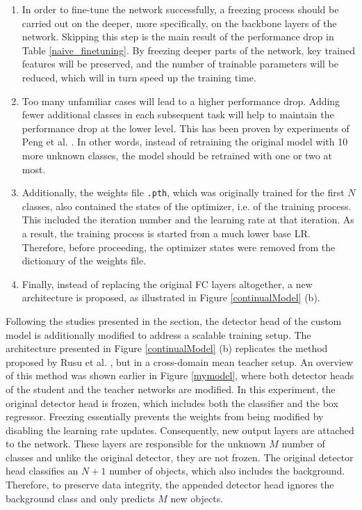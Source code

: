 \begin{enumerate}
\item In order to fine-tune the network successfully, a freezing process should be carried out on the deeper, more specifically, on the backbone layers of the network. Skipping this step is the main result of the performance drop in Table \ref{naive_finetuning}. By freezing deeper parts of the network, key trained features will be preserved, and the number of trainable parameters will be reduced, which will in turn speed up the training time. 
\item Too many unfamiliar cases will lead to a higher performance drop. Adding fewer additional classes in each subsequent task will help to maintain the performance drop at the lower level. This has been proven by experiments of Peng et al. \cite{Peng2020}. In other words, instead of retraining the original model with 10 more unknown classes, the model should be retrained with one or two at most. 
\item Additionally, the weights file \texttt{.pth}, which was originally trained for the first $N$ classes, also contained the states of the optimizer, i.e. of the training process. This included the iteration number and the learning rate at that iteration. As a result, the training process is started from a much lower base LR. Therefore, before proceeding, the optimizer states were removed from the dictionary of the weights file. 
\item Finally, instead of replacing the original FC layers altogether, a new architecture is proposed, as illustrated in Figure \ref{continualModel} (b). 
\end{enumerate}

Following the studies presented in the  section, the detector head of the custom model is additionally modified to address a scalable training setup. The architecture presented in Figure \ref{continualModel} (b) replicates the method proposed by Rusu et al. \cite{Rusu2016}, but in a cross-domain mean teacher setup. An overview of this method was shown earlier in Figure \ref{mymodel}, where both detector heads of the student and the teacher networks are modified. In this experiment, the original detector head is frozen, which includes both the classifier and the box regressor. Freezing essentially prevents the weights from being modified by disabling the learning rate updates. Consequently, new output layers are attached to the network. These layers are responsible for the unknown $M$ number of classes and unlike the original detector, they are not frozen. The original detector head classifies an $N+1$ number of objects, which also includes the background. Therefore, to preserve data integrity, the appended detector head ignores the background class and only predicts $M$ new objects. 

